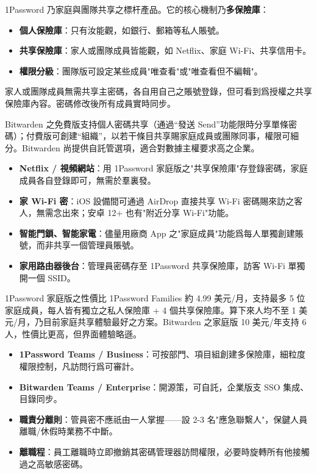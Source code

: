
1Password 乃家庭與團隊共享之標杆產品。它的核心機制乃\textbf{多保險庫}：

\begin{itemize}
  \item \textbf{個人保險庫}：只有汝能觀，如銀行、郵箱等私人賬號。
  \item \textbf{共享保險庫}：家人或團隊成員皆能觀，如 Netflix、家庭 Wi-Fi、共享信用卡。
  \item \textbf{權限分級}：團隊版可設定某些成員"唯查看"或"唯查看但不編輯"。
\end{itemize}

家人或團隊成員無需共享主密碼，各自用自己之賬號登錄，但可看到爲授權之共享保險庫內容。密碼修改後所有成員實時同步。


Bitwarden 之免費版支持個人密碼共享（通過“發送 Send”功能限時分享單條密碼）；付費版可創建“組織”，以若干條目共享賜家庭成員或團隊同事，權限可細分。Bitwarden 尚提供自託管選項，適合對數據主權要求高之企業。


\begin{itemize}
  \item \textbf{Netflix / 視頻網站}：用 1Password 家庭版之"共享保險庫"存登錄密碼，家庭成員各自登錄即可，無需於羣裏發。
  \item \textbf{家 Wi-Fi 密}：iOS 設備間可通過 AirDrop 直接共享 Wi-Fi 密碼賜來訪之客人，無需念出來；安卓 12+ 也有"附近分享 Wi-Fi"功能。
  \item \textbf{智能門鎖、智能家電}：儘量用廠商 App 之"家庭成員"功能爲每人單獨創建賬號，而非共享一個管理員賬號。
  \item \textbf{家用路由器後台}：管理員密碼存至 1Password 共享保險庫，訪客 Wi-Fi 單獨開一個 SSID。
\end{itemize}

\begin{tcbinfo}{1Password 家庭版之性價比}
1Password Families 約 4.99 美元/月，支持最多 5 位家庭成員，每人皆有獨立之私人保險庫 + 4 個共享保險庫。算下來人均不至 1 美元/月，乃目前家庭共享體驗最好之方案。Bitwarden 之家庭版 10 美元/年支持 6 人，性價比更高，但界面體驗略遜。

\end{tcbinfo}


\begin{itemize}
  \item \textbf{1Password Teams / Business}：可按部門、項目組創建多保險庫，細粒度權限控制，凡訪問行爲可審計。
  \item \textbf{Bitwarden Teams / Enterprise}：開源策，可自託，企業版支 SSO 集成、目錄同步。
  \item \textbf{職責分離則}：管員密不應祇由一人掌握——設 2-3 名"應急聯繫人"，保鍵人員離職/休假時業務不中斷。
  \item \textbf{離職程}：員工離職時立即撤銷其密碼管理器訪問權限，必要時旋轉所有他接觸過之高敏感密碼。
\end{itemize}

